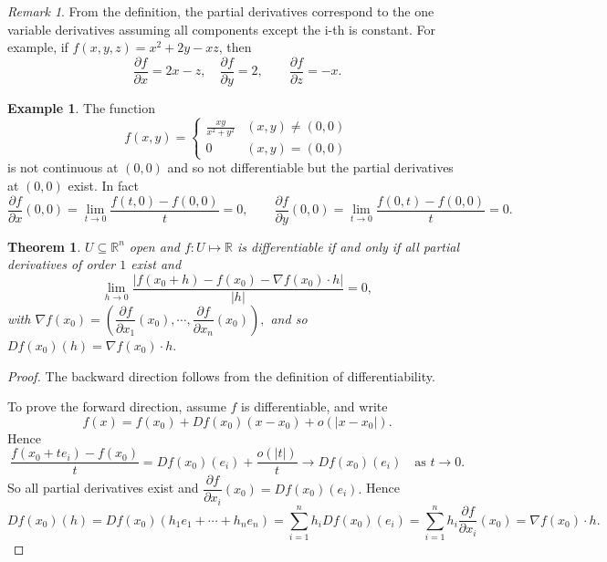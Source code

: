\documentclass[11pt,openany]{book}
\theoremstyle{plain}
\newtheorem{theorem}{Theorem}[chapter]
\theoremstyle{definition}
\newtheorem{example}{Example}[chapter]
\theoremstyle{remark}
\newtheorem{remark}{Remark}[chapter]
\newcommand{\R}{\mathbb{R}}
\begin{document}
\begin{remark}
    From the definition, the partial derivatives correspond to the one variable derivatives assuming all components except the i-th is constant. For example, if $f(x,y,z)=x^2+2y-xz$, then
    $$\dfrac{\partial f}{\partial x}=2x-z, \quad \dfrac{\partial f}{\partial y}=2,\qquad \dfrac{\partial f}{\partial z}=-x.$$
\end{remark}

\begin{example} The function
    \[f(x,y) = \begin{cases}
        \frac{xy}{x^2+y^2} & (x,y) \ne (0,0)\\
        0 & (x,y) = (0,0)
    \end{cases}\]
    is not continuous at $(0,0)$ and so not differentiable but the partial derivatives at $(0,0)$ exist. In fact
    $$\frac{\partial f}{\partial x}(0,0) = \lim_{t \to 0} \frac{f(t,0)-f(0,0)}{t} = 0,\qquad \frac{\partial f}{\partial y}(0,0) = \lim_{t \to 0} \frac{f(0,t)-f(0,0)}{t} = 0.$$
\end{example}

\begin{theorem}
    $U \subseteq \R^n$ open and $f: U \mapsto \R$ is differentiable if and only if all partial derivatives of order $1$ exist and \[\lim_{h\to 0} \frac{|f(x_0+h)-f(x_0)-\nabla f(x_0)\cdot h|}{|h|} = 0,\]
with $\nabla f(x_0)=\left(\dfrac{\partial f}{\partial x_1}(x_0),\cdots, \dfrac{\partial f}{\partial x_n}(x_0)\right),$
and so $Df(x_0)(h)=\nabla f(x_0)\cdot h.$
\end{theorem}

\begin{proof}
The backward direction follows from the definition of differentiability.

To prove the forward direction, assume $f$ is differentiable, and write
$$f(x)=f(x_0)+Df(x_0)(x-x_0)+o(|x-x_0|).$$
Hence
$$\dfrac{f(x_0+te_i)-f(x_0)}{t}=Df(x_0)(e_i)+\dfrac{o(|t|)}{t}\to Df(x_0)(e_i)\quad \text{as $t\to 0$}.$$
So all partial derivatives exist and $\dfrac{\partial f}{\partial x_i}(x_0)=Df(x_0)(e_i).$
Hence
$$Df(x_0)(h)=Df(x_0)(h_1e_1+\cdots+h_ne_n)=\sum_{i=1}^n h_iDf(x_0)(e_i)=\sum_{i=1}^n h_i\dfrac{\partial f}{\partial x_i}(x_0)=\nabla f(x_0)\cdot h.$$ 
\end{proof}
\end{document}
